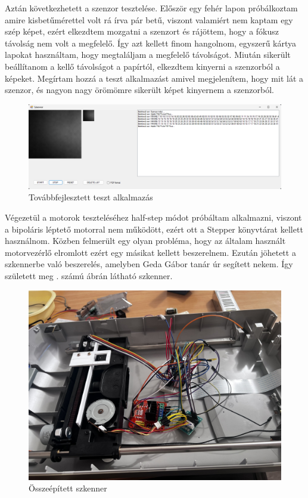 \documentclass[]{thesis-ekf}
\theoremstyle{definition}
\theoremstyle{remark}
\begin{document}
	Aztán következhetett a szenzor tesztelése. Először egy fehér lapon próbálkoztam amire kisbetűmérettel volt rá írva pár betű, viszont valamiért nem kaptam egy szép képet, ezért elkezdtem mozgatni a szenzort és rájöttem, hogy a fókusz távolság nem volt a megfelelő. Így azt kellett finom hangolnom, egyszerű kártya lapokat használtam, hogy megtaláljam a megfelelő távolságot. Miután sikerült beállítanom a kellő távolságot a papírtól, elkezdtem kinyerni a szenzorból a képeket. Megírtam hozzá a teszt alkalmazást amivel megjelenítem, hogy mit lát a szenzor, és nagyon nagy örömömre sikerült képet kinyernem a szenzorból.
	\begin{figure}[th!]
		\centering
		\includegraphics[width=1\linewidth]{tesztalkalmazas2}
		\caption[Teszt2]{Továbbfejlesztett teszt alkalmazás}
		\label{fig:tesztalkalmazas2}
	\end{figure}
	
	Végezetül a motorok teszteléséhez half-step módot próbáltam alkalmazni, viszont a bipoláris léptető motorral nem működött, ezért ott a Stepper\cite{stepper} könyvtárat kellett használnom. Közben felmerült egy olyan probléma, hogy az általam használt motorvezérlő elromlott ezért egy másikat kellett beszerelnem. Ezután jöhetett a szkennerbe való beszerelés, amelyben Geda Gábor tanár úr segített nekem. Így született meg . számú ábrán látható szkenner.
	\begin{figure}[th!]
		\centering
		\includegraphics[width=0.7\linewidth]{scanner}
		\caption[Összeépített szkenner]{Összeépített szkenner}
		\label{fig:scanner_prototype}
	\end{figure}
	\pagebreak
	
\end{document}
